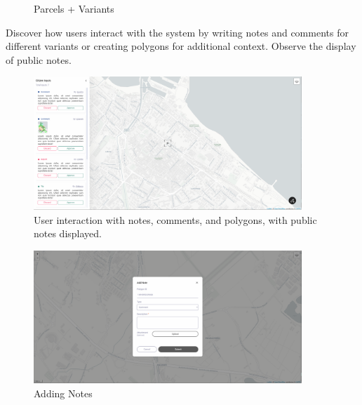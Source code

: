 \begin{figure}[H]
\begin{minipage}{0.48\textwidth}
        \caption{Parcels + Variants}
        \label{fig:web-map-all-data}
    \end{minipage}
\end{figure}


Discover how users interact with the system by writing notes and comments for different variants or creating polygons for additional context.
Observe the display of public notes.
\begin{figure}[H]
    \centering
    \includegraphics[width=0.9\textwidth]{res/web/notes-main}
    \caption{User interaction with notes, comments, and polygons, with public notes displayed.}
    \label{fig:web-notes}
\end{figure}

\begin{figure}[H]
    \centering
    \includegraphics[width=0.9\textwidth]{res/web/add-note}
    \caption{Adding Notes}
    \label{fig:web-add-note}
\end{figure}

